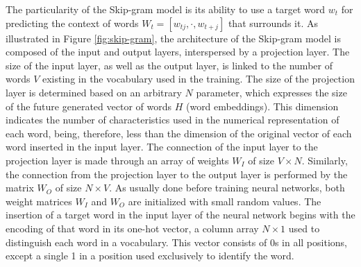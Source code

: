 \documentclass{ieeeaccess}
\begin{document}
The particularity of the Skip-gram model is its ability to use a target word $ w_ {t} $ for  predicting the context of words $ W_t = [w_ {tj}, \cdot, w_ {t + j}] $ that surrounds it. As illustrated in Figure \ref{fig:skip-gram}, the architecture of the Skip-gram model is composed of the input and output layers, interspersed by a projection layer. The size of the input layer, as well as the output layer, is linked to the number of words $ V $ existing in the vocabulary used in the training. The size of the projection layer is determined based on an arbitrary $ N $ parameter, which expresses the size of the future generated vector of words $ H $ (word embeddings). This dimension indicates the number of characteristics used in the numerical representation of each word, being, therefore, less than the dimension of the original vector of each word inserted in the input layer. The connection of the input layer to the projection layer is made through an array of weights $ W_ {I} $ of size $ V \times N $. Similarly, the connection from the projection layer to the output layer is performed by the matrix $ W_ {O} $ of size $ N \times V $. As usually done before training neural networks, both weight matrices $ W_ {I} $ and $ W_ {O} $ are initialized with small random values. The insertion of a target word in the input layer of the neural network begins with the encoding of that word in its one-hot vector, a column array $ N \times 1 $ used to distinguish each word in a vocabulary. This vector consists of 0s in all positions, except a single 1 in a position used exclusively to identify the word.

\end{document}
